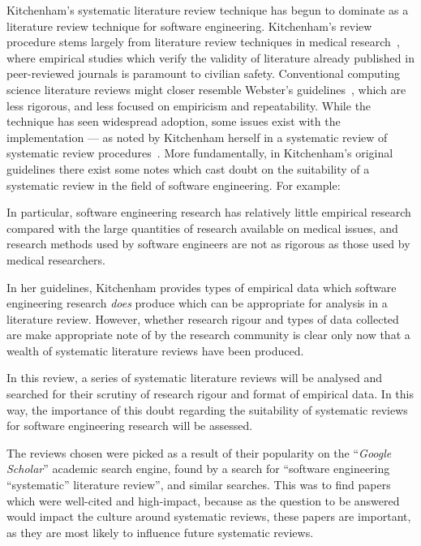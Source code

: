 Kitchenham's systematic literature review technique has begun to dominate as a literature review technique for software engineering. Kitchenham's review procedure stems largely from literature review techniques in medical research~\citep{Kitchenham2004, khan2001undertaking}, where empirical studies which verify the validity of literature already published in peer-reviewed journals is paramount to civilian safety. Conventional computing science literature reviews might closer resemble Webster's guidelines~\citep{Webster2002}, which are less rigorous, and less focused on empiricism and repeatability. While the technique has seen widespread adoption, some issues exist with the implementation --- as noted by Kitchenham herself in a systematic review of systematic review procedures~\citep{Kitchenham2013}. More fundamentally, in Kitchenham's original guidelines there exist some notes which cast doubt on the suitability of a systematic review in the field of software engineering. For example:
\begin{displayquote}
    In particular, software engineering research has relatively little empirical research compared with the large quantities of research available on medical issues, and research methods used by software engineers are not as rigorous as those used by medical researchers.
\end{displayquote}
In her guidelines, Kitchenham provides types of empirical data which software engineering research \emph{does} produce which can be appropriate for analysis in a literature review. However, whether research rigour and types of data collected are make appropriate note of by the research community is clear only now that a wealth of systematic literature reviews have been produced.\par

In this review, a series of systematic literature reviews will be analysed and searched for their scrutiny of research rigour and format of empirical data. In this way, the importance of this doubt regarding the suitability of systematic reviews for software engineering research will be assessed.\par

The reviews chosen were picked as a result of their popularity on the ``\emph{Google Scholar}'' academic search engine, found by a search for ``software engineering ``systematic'' literature review'', and similar searches. This was to find papers which were well-cited and high-impact, because as the question to be answered would impact the culture around systematic reviews, these papers are important, as they are most likely to influence future systematic reviews.\par


